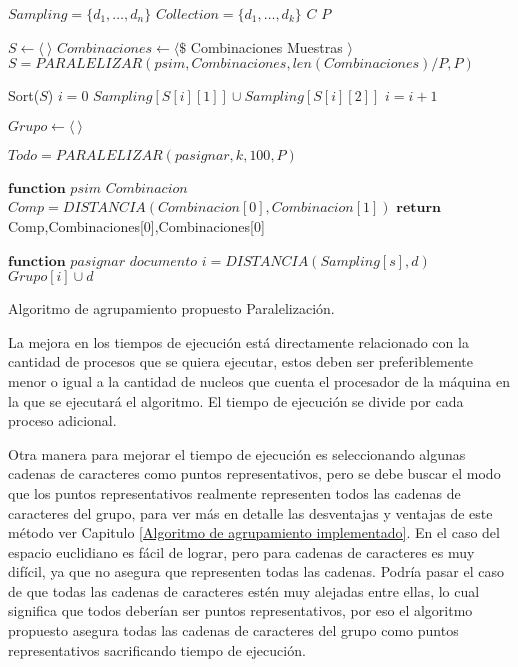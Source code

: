 \begin{algorithm}[h!]
\begin{algorithmic}[1]
\REQUIRE $Sampling=\{d_{1}, \dots, d_{n} \}$
\REQUIRE $Collection=\{d_{1}, \dots, d_{k} \}$ 
\REQUIRE $C$ 
\REQUIRE $P$ 

\STATE $S \leftarrow \langle\ \rangle$
\STATE $Combinaciones \leftarrow \langle\$$ Combinaciones Muestras $\rangle$
\STATE $S = PARALELIZAR(psim,Combinaciones, len(Combinaciones)/P, P)$ 

\STATE Sort($S$)
\STATE $i = 0$
	\STATE $ Sampling[S[i][1]] \cup Sampling[S[i][2]]$
	\STATE $i = i +1$
\ENDWHILE

\STATE $Grupo \leftarrow \langle\ \rangle$  


\STATE $Todo = PARALELIZAR(pasignar, k , 100 , P)$ 

\hrulefill

\STATE $\textbf{function}$ $psim$
\REQUIRE $Combinacion$		 
		\STATE\hspace{\algorithmicindent} $Comp = DISTANCIA(Combinacion[0],Combinacion[1])$
		\STATE\hspace{\algorithmicindent} $\textbf{return}$ Comp,Combinaciones[0],Combinaciones[0]


\hrulefill

\STATE $\textbf{function}$ $pasignar$
\REQUIRE $documento$
			\STATE $i = DISTANCIA(Sampling[s],d)$
		\ENDIF
\ENDFOR
\STATE $Grupo[i] \cup d$

\end{algorithmic}
\caption{Algoritmo de agrupamiento propuesto Paralelización.}\label{alg4} 
\end{algorithm}

\newpage
La mejora en los tiempos de ejecución está directamente relacionado con la cantidad de procesos que se quiera ejecutar, estos deben ser preferiblemente menor o igual a la cantidad de nucleos que cuenta el procesador de la máquina en la que se ejecutará el algoritmo. El tiempo de ejecución se divide por cada proceso adicional.

Otra manera para mejorar el tiempo de ejecución es seleccionando algunas cadenas de caracteres como puntos representativos, pero se debe buscar el modo que los puntos representativos realmente representen todos las cadenas de caracteres del grupo, para ver más en detalle las desventajas y ventajas de este método ver Capitulo \ref{Algoritmo de agrupamiento implementado}. En el caso del espacio euclidiano es fácil de lograr, pero para cadenas de caracteres es muy difícil, ya que no asegura que representen todas las cadenas. Podría pasar el caso de que todas las cadenas de caracteres estén muy alejadas entre ellas, lo cual significa que todos deberían ser puntos representativos, por eso el algoritmo propuesto asegura todas las cadenas de caracteres del grupo como puntos representativos sacrificando tiempo de ejecución.



